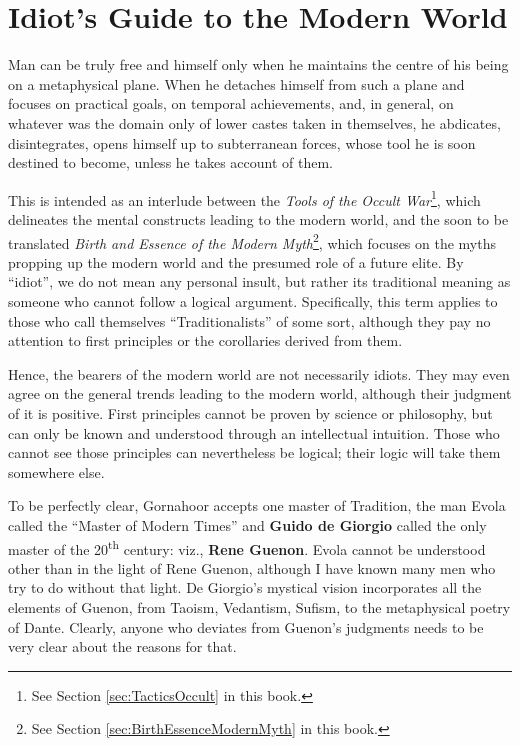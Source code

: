 \section{Idiot’s Guide to the Modern World}

\begin{quotex}
Man can be truly free and himself only when he maintains the centre of his being on a metaphysical plane. When he detaches himself from such a plane and focuses on practical goals, on temporal achievements, and, in general, on whatever was the domain only of lower castes taken in themselves, he abdicates, disintegrates, opens himself up to subterranean forces, whose tool he is soon destined to become, unless he takes account of them.
\end{quotex}


This is intended as an interlude between the \textit{Tools of the Occult War}\footnote{See Section \ref{sec:TacticsOccult} in this book.}, which delineates the mental constructs leading to the modern world, and the soon to be translated \textit{Birth and Essence of the Modern Myth}\footnote{See Section \ref{sec:BirthEssenceModernMyth} in this book.}, which focuses on the myths propping up the modern world and the presumed role of a future elite. By ``idiot'', we do not mean any personal insult, but rather its traditional meaning as someone who cannot follow a logical argument. Specifically, this term applies to those who call themselves ``Traditionalists'' of some sort, although they pay no attention to first principles or the corollaries derived from them.

Hence, the bearers of the modern world are not necessarily idiots. They may even agree on the general trends leading to the modern world, although their judgment of it is positive. First principles cannot be proven by science or philosophy, but can only be known and understood through an intellectual intuition. Those who cannot see those principles can nevertheless be logical; their logic will take them somewhere else.

To be perfectly clear, Gornahoor accepts one master of Tradition, the man Evola called the ``Master of Modern Times'' and \textbf{Guido de Giorgio} called the only master of the 20\textsuperscript{th} century: viz., \textbf{Rene Guenon}. Evola cannot be understood other than in the light of Rene Guenon, although I have known many men who try to do without that light. De Giorgio's mystical vision incorporates all the elements of Guenon, from Taoism, Vedantism, Sufism, to the metaphysical poetry of Dante. Clearly, anyone who deviates from Guenon's judgments needs to be very clear about the reasons for that.

